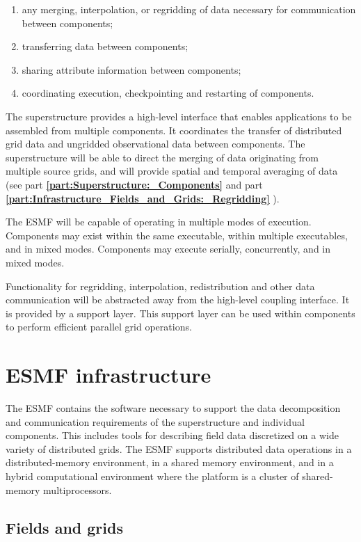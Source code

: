 \begin{enumerate}
\item any merging, interpolation, or regridding 
of data necessary for communication between components;
\item transferring data between components;
\item sharing attribute information between components;
\item coordinating execution, checkpointing and restarting of
  components.
\end{enumerate}

The superstructure provides a high-level interface that enables 
applications to be assembled from multiple components.  It coordinates
the transfer of distributed grid data and ungridded 
observational data between components.  The superstructure will be able 
to direct the merging of data originating from multiple source grids, and will 
provide spatial and temporal averaging of data (see part {\bf \ref{part:Superstructure:_Components}}
and part {\bf \ref{part:Infrastructure_Fields_and_Grids:_Regridding} }).

The ESMF will be capable of operating in multiple modes of execution.
Components may exist within the same executable, within multiple 
executables, and in mixed modes.  Components may execute serially, 
concurrently, and in mixed modes.

Functionality for regridding, interpolation, redistribution and other 
data communication will be abstracted away from the high-level coupling
interface.  It is provided by a support layer.  
This support layer can be used within components
to perform efficient parallel grid operations.

\section{ESMF infrastructure}
\label{sec:ESMF_infrastructure}

The ESMF contains the software necessary to support the data
decomposition and communication requirements of the superstructure and
individual components.  This includes tools for describing field
data discretized on a wide variety of distributed grids.  The ESMF
supports distributed data operations in a distributed-memory environment, 
in a shared memory environment, and in a hybrid computational environment 
where the platform is a cluster of shared-memory multiprocessors.

\subsection{Fields and grids}

